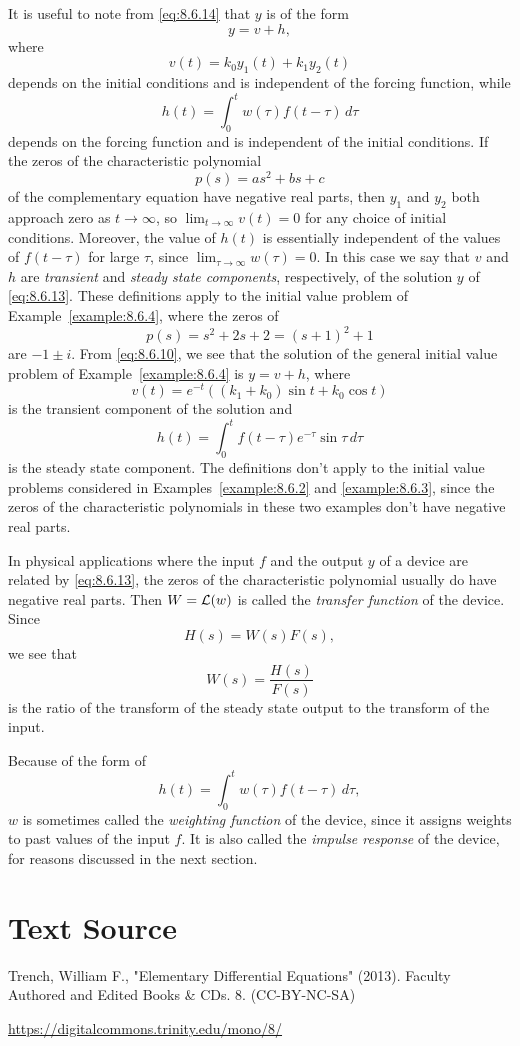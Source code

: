 \documentclass{ximera}
\begin{document}
It is useful to note from \eqref{eq:8.6.14} that $y$ is of the form
$$
y=v+h,
$$
where
$$
v(t)=k_0y_1(t)+k_1y_2(t)
$$
depends on the initial conditions and is independent of the forcing
function, while
$$
h(t)=\int_0^tw(\tau)f(t-\tau)\,
d\tau
$$
depends on the forcing function and is independent of the initial
conditions. If the zeros of the characteristic polynomial
$$
p(s)=as^2+bs+c
$$
of the complementary equation have negative real parts, then $y_1$ and
$y_2$ both approach zero as $t\rightarrow\infty$, so $\lim_{t\rightarrow\infty}v(t)=0$
for any choice of initial conditions. Moreover, the value of $h(t)$ is
essentially independent of the values of $f(t-\tau)$ for large $\tau$,
since $\lim_{\tau\rightarrow\infty}w(\tau)=0$. In this case we say that $v$
and $h$ are \textit{transient} and \textit{steady state components},
respectively, of the solution $y$ of \eqref{eq:8.6.13}. These definitions
apply to the initial value problem of Example~\ref{example:8.6.4}, where
the zeros of
$$
p(s)=s^2+2s+2=(s+1)^2+1
$$
are $-1\pm i$. From  \eqref{eq:8.6.10}, we see that the solution of the
general initial value problem  of Example~\ref{example:8.6.4} is $y=v+h$,
where
$$
v(t)=e^{-t}\left((k_1+k_0)\sin t+k_0\cos t\right)
$$
is the transient component of the solution and
$$
h(t)=\int_0^t f(t-\tau)e^{-\tau}\sin\tau\,d\tau
$$
is the steady state component. The definitions don't apply to the initial
value problems  considered in Examples~\ref{example:8.6.2} and
\ref{example:8.6.3}, since the zeros of the characteristic polynomials
in these two examples don't have negative real parts.

In physical applications where the input $f$ and the output $y$ of a
device are related by \eqref{eq:8.6.13}, the zeros of the characteristic
polynomial usually do have negative real parts. Then $W={\cal L}(w)$
is called the \textit{transfer function} of the device. Since
$$
H(s)=W(s)F(s),
$$
we see that
$$
W(s)=\frac{H(s)}{F(s)}
$$
is the ratio of the transform of the steady state output to the transform
of the input.

 Because of the form of
$$
h(t)=\int_0^tw(\tau)f(t-\tau)\,d\tau,
$$
$w$ is sometimes called the \textit{weighting function} of the device,
since it assigns weights to past values of the input $f$. It is also
called the \textit{impulse response} of the device, for reasons
discussed in the next section.


\section*{Text Source}
Trench, William F., "Elementary Differential Equations" (2013). Faculty Authored and Edited Books \& CDs. 8. (CC-BY-NC-SA)

\href{https://digitalcommons.trinity.edu/mono/8/}{https://digitalcommons.trinity.edu/mono/8/}
\end{document}
